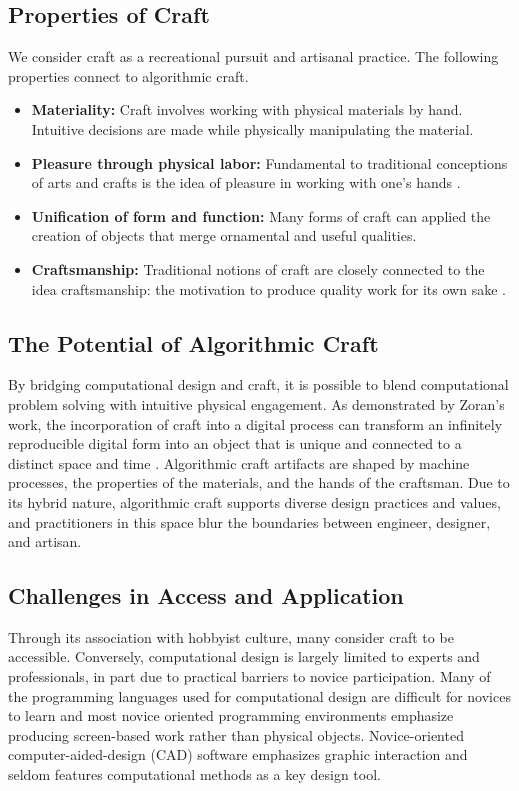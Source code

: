 \documentclass{sigchi}
\begin{document}
\subsection{Properties of Craft}
We consider craft as a recreational pursuit and artisanal practice. The following properties connect to algorithmic craft.
\begin{itemize}
\item \textbf{Materiality:} Craft involves working with physical materials by hand. Intuitive decisions are made while physically manipulating the material. 
\vspace{-6pt}
\item \textbf{Pleasure through physical labor:} Fundamental to traditional conceptions of arts and crafts is the idea of pleasure in working with one's hands \cite{abstracting_craft}.
\vspace{-6pt}
\item \textbf{Unification of form and function:} Many forms of craft can applied the creation of objects that merge ornamental and useful qualities.
\vspace{-6pt}
\item \textbf{Craftsmanship:} Traditional notions of craft are closely connected to the idea craftsmanship: the motivation to produce quality work for its own sake \cite{the_craftsman}.
\end{itemize}

\subsection{The Potential of Algorithmic Craft}
By bridging computational design and craft, it is possible to blend computational problem solving with intuitive physical engagement. As demonstrated by Zoran's work, the incorporation of craft into a digital process can transform an infinitely reproducible digital form into an object that is unique and connected to a distinct space and time \cite{zoran}. Algorithmic craft artifacts are shaped by machine processes, the properties of the materials, and the hands of the craftsman. Due to its hybrid nature, algorithmic craft supports diverse design practices and values, and practitioners in this space blur the boundaries between engineer, designer, and artisan.

\subsection{Challenges in Access and Application}
Through its association with hobbyist culture, many consider craft to be accessible. Conversely, computational design is largely limited to experts and professionals, in part due to practical barriers to novice participation. Many of the programming languages used for computational design are difficult for novices to learn and most novice oriented programming environments emphasize producing screen-based work rather than physical objects. Novice-oriented computer-aided-design (CAD) software emphasizes graphic interaction and seldom features computational methods as a key design tool. 
\end{document}
